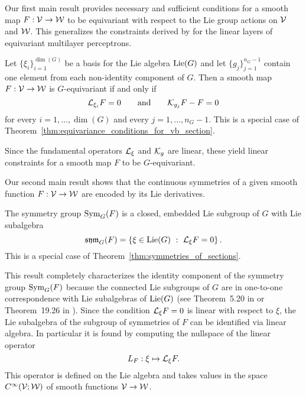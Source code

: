 \documentclass[twoside,11pt]{article}
\begin{document}
Our first main result provides necessary and sufficient conditions for a smooth map $F:{\mathcal{V}} \to {\mathcal{W}}$ to be equivariant with respect to the Lie group actions on ${\mathcal{V}}$ and ${\mathcal{W}}$.
This generalizes the constraints derived by \cite{Finzi2021practical} for the linear layers of equivariant multilayer perceptrons.
\begin{theorem}
    \label{thm:invariance_conditions_for_real_map}
    Let $\{ \xi_i \}_{i=1}^{\dim(G)}$ be a basis for the Lie algebra $\operatorname{Lie}(G)$ and let $\{ g_j \}_{j=1}^{n_G-1}$ contain one element from each non-identity component of $G$.
    Then a smooth map $F:{\mathcal{V}} \to {\mathcal{W}}$ is $G$-equivariant if and only if
    \begin{equation}
        {\mathcal{L}}_{\xi_i} F = 0 \qquad \mbox{and} \qquad
        {\mathcal{K}}_{g_j} F - F = 0
        \label{eqn:equivariance_everywhere_for_real_map}
    \end{equation}
    for every $i=1,\ldots,\dim(G)$ and every $j=1,\ldots, n_G - 1$.
    This is a special case of Theorem~\ref{thm:equivariance_conditions_for_vb_section}.
\end{theorem}
Since the fundamental operators ${\mathcal{L}}_{\xi}$ and ${\mathcal{K}}_g$ are linear, these yield linear constraints for a smooth map $F$ to be $G$-equivariant.

Our second main result shows that the continuous symmetries of a given smooth function $F:{\mathcal{V}} \to {\mathcal{W}}$ are encoded by its Lie derivatives.
\begin{theorem}
    \label{thm:symmetries_of_a_map}
    The symmetry group $\operatorname{Sym}_G(F)$ is a closed, embedded Lie subgroup of $G$ with Lie subalgebra
    \begin{equation}
        \operatorname{\mathfrak{sym}}_G(F) = \left\{ \xi \in \operatorname{Lie}(G) \ : \ {\mathcal{L}}_{\xi} F = 0 \right\}.
    \end{equation}
    This is a special case of Theorem~\ref{thm:symmetries_of_sections}.
\end{theorem}
This result completely characterizes the identity component of the symmetry group $\operatorname{Sym}_G(F)$ because the connected Lie subgroups of $G$ are in one-to-one correspondence with Lie subalgebras of $\operatorname{Lie}(G)$ (see Theorem~5.20 in \cite{Hall2015Lie} or Theorem~19.26 in \cite{Lee2013introduction}).
Since the condition ${\mathcal{L}}_{\xi} F = 0$ is linear with respect to $\xi$, the Lie subalgebra of the subgroup of symmetries of $F$ can be identified via linear algebra.
In particular it is found by computing the nullspace of the linear operator 
\begin{equation} \label{eqn:L_F_op_for_vector_space_case}
    L_F : \xi \mapsto {\mathcal{L}}_{\xi} F.
\end{equation}
This operator is defined on the Lie algebra and takes values in the space $C^{\infty}({\mathcal{V}}; {\mathcal{W}})$ of smooth functions ${\mathcal{V}} \to {\mathcal{W}}$.
\end{document}
